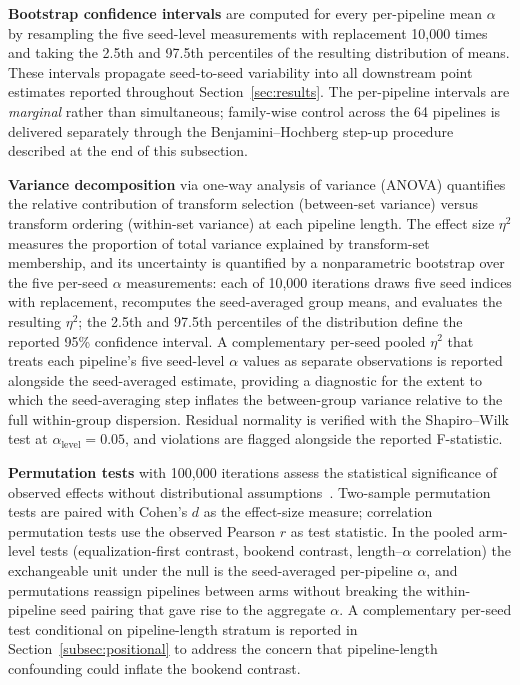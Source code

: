 \documentclass[preprint,5p,times,twocolumn]{elsarticle}
\begin{document}
\textbf{Bootstrap confidence intervals} are computed for every per-pipeline mean $\alpha$ by resampling the five seed-level measurements with replacement 10{,}000 times and taking the 2.5th and 97.5th percentiles of the resulting distribution of means. These intervals propagate seed-to-seed variability into all downstream point estimates reported throughout Section~\ref{sec:results}. The per-pipeline intervals are \emph{marginal} rather than simultaneous; family-wise control across the 64 pipelines is delivered separately through the Benjamini--Hochberg step-up procedure described at the end of this subsection.

\textbf{Variance decomposition} via one-way analysis of variance (ANOVA) quantifies the relative contribution of transform selection (between-set variance) versus transform ordering (within-set variance) at each pipeline length. The effect size $\eta^2$ measures the proportion of total variance explained by transform-set membership, and its uncertainty is quantified by a nonparametric bootstrap over the five per-seed $\alpha$ measurements: each of 10{,}000 iterations draws five seed indices with replacement, recomputes the seed-averaged group means, and evaluates the resulting $\eta^2$; the 2.5th and 97.5th percentiles of the distribution define the reported 95\% confidence interval. A complementary per-seed pooled $\eta^2$ that treats each pipeline's five seed-level $\alpha$ values as separate observations is reported alongside the seed-averaged estimate, providing a diagnostic for the extent to which the seed-averaging step inflates the between-group variance relative to the full within-group dispersion. Residual normality is verified with the Shapiro--Wilk test at $\alpha_{\text{level}} = 0.05$, and violations are flagged alongside the reported F-statistic.

\textbf{Permutation tests} with 100{,}000 iterations assess the statistical significance of observed effects without distributional assumptions~\cite{Good2005}. Two-sample permutation tests are paired with Cohen's $d$ as the effect-size measure; correlation permutation tests use the observed Pearson $r$ as test statistic. In the pooled arm-level tests (equalization-first contrast, bookend contrast, length--$\alpha$ correlation) the exchangeable unit under the null is the seed-averaged per-pipeline $\alpha$, and permutations reassign pipelines between arms without breaking the within-pipeline seed pairing that gave rise to the aggregate $\alpha$. A complementary per-seed test conditional on pipeline-length stratum is reported in Section~\ref{subsec:positional} to address the concern that pipeline-length confounding could inflate the bookend contrast.
\end{document}
